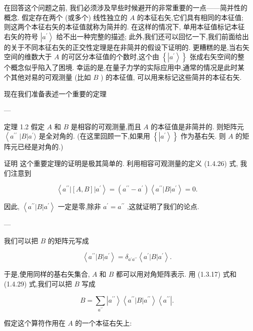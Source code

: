 \documentclass[lang=cn,newtx,10pt,scheme=chinese,thmcnt=section]{elegantbook}
\begin{document}
在回答这个问题之前, 我们必须涉及早些时候避开的非常重要的一点——简并性的概念. 假定存在两个 (或多个) 线性独立的 $A$ 的本征右矢,它们具有相同的本征值; 则这两个本征右矢的本征值就称为简并的. 在这样的情况下, 单用本征值标记本征右矢的符号 $\left| {a}^{\prime }\right\rangle$ 给不出一种完整的描述; 此外,我们还可以回忆一下,我们前面给出的关于不同本征右矢的正交性定理是在非简并的假设下证明的. 更糟糕的是,当右矢空间的维数大于 $A$ 的可区分本征值的个数时,这个由 $\left\{ \left| {a}^{\prime }\right\rangle \right\}$ 张成右矢空间的整个概念似乎陷入了困境. 幸运的是,在量子力学的实际应用中,通常的情况是此时某个其他对易的可观测量 (比如 $B$ ) 的本征值, 可以用来标记这些简并的本征右矢.

现在我们准备表述一个重要的定理

---

定理 1.2 假定 $A$ 和 $B$ 是相容的可观测量,而且 $A$ 的本征值是非简并的. 则矩阵元 $\left\langle {a}^{\prime \prime }\right.$ $\left| B\right| {a}^{\prime }\rangle$ 是全对角的. (在这里回顾一下,如果用 $\left\{ \left| {a}^{\prime }\right\rangle \right\}$ 作为基右矢. 则 $A$ 的矩阵元已经是对角的.)

证明 这个重要定理的证明是极其简单的. 利用相容可观测量的定义 (1.4.26) 式, 我们注意到

$$
\left\langle {{a}^{\prime \prime }\left| \left\lbrack {A, B}\right\rbrack \right| {a}^{\prime }}\right\rangle = \left( {{a}^{\prime \prime } - {a}^{\prime }}\right) \left\langle {{a}^{\prime \prime }\left| B\right| {a}^{\prime }}\right\rangle = 0. \tag{1. 4.28}
$$

因此, $\left\langle {{a}^{\prime \prime }\left| B\right| {a}^{\prime }}\right\rangle$ 一定是零,除非 ${a}^{\prime } = {a}^{\prime \prime }$ ,这就证明了我们的论点.

---

我们可以把 $B$ 的矩阵元写成

$$
\left\langle {{a}^{\prime \prime }\left| B\right| {a}^{\prime }}\right\rangle = {\delta }_{{a}^{\prime }{a}^{\prime \prime }}\left\langle {{a}^{\prime }\left| B\right| {a}^{\prime }}\right\rangle . \tag{1.4.29}
$$

于是,使用同样的基右矢集合, $A$ 和 $B$ 都可以用对角矩阵表示. 用 (1.3.17) 式和 (1.4.29) 式,我们可以把 $B$ 写成

$$
B = \mathop{\sum }\limits_{{a}^{\prime \prime }}\left| {a}^{\prime \prime }\right\rangle \left\langle {{a}^{\prime \prime }\left| B\right| {a}^{\prime \prime }}\right\rangle \left\langle {a}^{\prime \prime }\right| . \tag{1. 4.30}
$$

假定这个算符作用在 $A$ 的一个本征右矢上:
\end{document}
